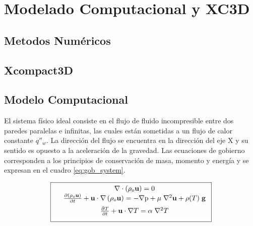 \chapter{Modelado Computacional y XC3D}

\section{Metodos Numéricos}

\section{Xcompact3D}
\cite{kawamura2000dns}
\section{Modelo Computacional}

El sistema físico ideal consiste en el flujo de fluido incompresible entre dos paredes paralelas e infinitas, las cuales están sometidas a un flujo de calor constante $q''_w$. La dirección del flujo se encuentra en la dirección del eje X y su sentido es opuesto a la aceleración de la gravedad. Las ecuaciones de gobierno corresponden a los principios de conservación de masa, momento y energía y se expresan en el cuadro \ref{eq:gob_system}.  

\begin{equation}
        \boxed{ \begin{array}{lcc}
              &  \nabla \cdot \left( \rho_o \mathbf{u} \right) = 0 \\
              \vspace*{2mm}
              &  \frac{\partial \left( \rho_o \mathbf{u} \right)}{\partial t} + \mathbf{u} \cdot \nabla  \left( \rho_o \mathbf{u} \right) = -\nabla \text{p} + \mu \hspace{1mm} {\nabla}^2 \mathbf{u}  + \rho(T) \hspace{1mm} \mathbf{g} \\
              \vspace*{2mm}
              &  \frac{\partial T}{\partial t} + \mathbf{u} \cdot \nabla T =  \alpha \hspace{1mm} \nabla^2 T  \\
             \end{array}
               }
             \label{eq:gob_system}
\end{equation}

